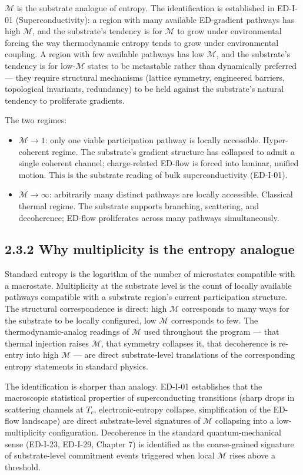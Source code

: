 \documentclass[11pt]{book}
\begin{document}
$\mathcal{M}$ is the substrate analogue of entropy. The identification is established in ED-I-01 (Superconductivity): a region with many available ED-gradient pathways has high $\mathcal{M}$, and the substrate's tendency is for $\mathcal{M}$ to grow under environmental forcing the way thermodynamic entropy tends to grow under environmental coupling. A region with few available pathways has low $\mathcal{M}$, and the substrate's tendency is for low-$\mathcal{M}$ states to be metastable rather than dynamically preferred — they require structural mechanisms (lattice symmetry, engineered barriers, topological invariants, redundancy) to be held against the substrate's natural tendency to proliferate gradients.

The two regimes:
\begin{itemize}
\item $\mathcal{M} \to 1$: only one viable participation pathway is locally accessible. Hyper-coherent regime. The substrate's gradient structure has collapsed to admit a single coherent channel; charge-related ED-flow is forced into laminar, unified motion. This is the substrate reading of bulk superconductivity (ED-I-01).
\item $\mathcal{M} \to \infty$: arbitrarily many distinct pathways are locally accessible. Classical thermal regime. The substrate supports branching, scattering, and decoherence; ED-flow proliferates across many pathways simultaneously.
\end{itemize}

\subsection{2.3.2 Why multiplicity is the entropy analogue}

Standard entropy is the logarithm of the number of microstates compatible with a macrostate. Multiplicity at the substrate level is the count of locally available pathways compatible with a substrate region's current participation structure. The structural correspondence is direct: high $\mathcal{M}$ corresponds to many ways for the substrate to be locally configured, low $\mathcal{M}$ corresponds to few. The thermodynamic-analog readings of $\mathcal{M}$ used throughout the program — that thermal injection raises $\mathcal{M}$, that symmetry collapses it, that decoherence is re-entry into high $\mathcal{M}$ — are direct substrate-level translations of the corresponding entropy statements in standard physics.

The identification is sharper than analogy. ED-I-01 establishes that the macroscopic statistical properties of superconducting transitions (sharp drops in scattering channels at $T_c$, electronic-entropy collapse, simplification of the ED-flow landscape) are direct substrate-level signatures of $\mathcal{M}$ collapsing into a low-multiplicity configuration. Decoherence in the standard quantum-mechanical sense (ED-I-23, ED-I-29, Chapter 7) is identified as the coarse-grained signature of substrate-level commitment events triggered when local $\mathcal{M}$ rises above a threshold.
\end{document}
